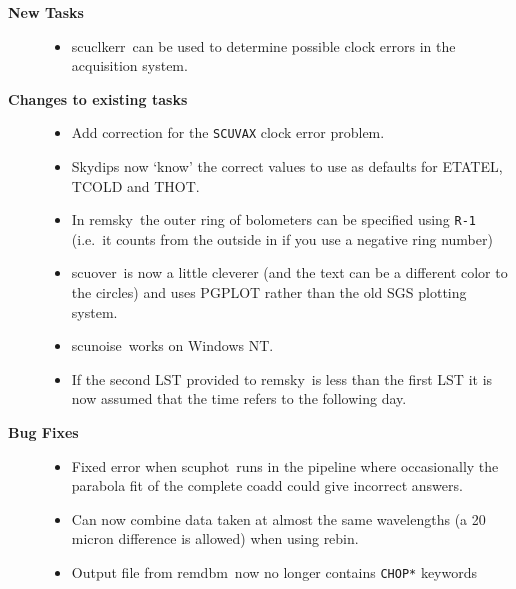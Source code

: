 \documentclass[twoside,11pt]{article}
\newcommand{\task}[1]{{\sf #1}}
\newcommand{\rebin}{\htmlref{\task{rebin}}{REBIN}}
\newcommand{\scuphot}{\htmlref{\task{scuphot}}{SCUPHOT}}
\newcommand{\remsky}{\htmlref{\task{remsky}}{REMSKY}}
\newcommand{\scuover}{\htmlref{\task{scuover}}{SCUOVER}}
\newcommand{\scuclkerr}{\htmlref{\task{scuclkerr}}{SCUCLKERR}}
\newcommand{\remdbm}{\htmlref{\task{remdbm}}{REMDBM}}
\newcommand{\scunoise}{\htmlref{\task{scunoise}}{SCUNOISE}}
\newcommand{\htmlref}[2]{#1}
\renewcommand{\_}{\texttt{\symbol{95}}}
\begin{document}
\begin{description}

\item[\textbf{New Tasks}] \mbox{}

\begin{itemize}
\item \scuclkerr\ can be used to determine possible clock errors
    in the acquisition system.
\end{itemize}


\item[\textbf{Changes to existing tasks}] \mbox{}

\begin{itemize}
\item Add correction for the \texttt{SCUVAX} clock error problem.

\item Skydips now `know'  the correct values to use as defaults for ETA\_TEL,
T\_COLD and T\_HOT.

\item In \remsky\ the outer ring of bolometers can be specified using \texttt{R-1} (i.e.\ it counts from the outside in if you use a negative ring number)

\item \scuover\ is now a little cleverer (and the text can be a different
    color to the circles) and uses PGPLOT rather than the old SGS plotting
    system.

 \item \scunoise\ works on Windows NT.

 \item If the second LST provided to \remsky\ is less than the first
    LST it is now assumed that the time refers to the following day.

\end{itemize}

\item[\textbf{Bug Fixes}] \mbox{}

\begin{itemize}
\item Fixed error when \scuphot\ runs in the pipeline where occasionally the
    parabola fit of the complete coadd could give incorrect answers.

\item Can now combine data taken at almost the same wavelengths (a 20 micron
    difference is allowed) when using \rebin.

 \item Output file from \remdbm\ now no longer contains \texttt{CHOP\_*}
keywords 

\end{itemize}

\end{description}
\end{document}
